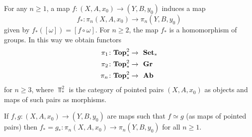 \begin{nn}
For any $n\geq 1$, a map $f\colon (X, A, x_{0}) \to (Y, B, y_{0})$ induces a map 
\[
f_{\ast}\colon \pi_{n}(X, A, x_{0}) \to \pi_{n}(Y, B, y_{0})
\] 
given by $f_{\ast}([\omega]) = [f\circ\omega]$. For $n\geq 2$, the map $f_{\ast}$
is a homomorphism of groups. In this way we obtain functors
\begin{align*}
\pi_{1}\colon {\mathbf{Top}}^{2}_{\ast} \to &\ \  {\mathbf{Set}}_{\ast} \\
\pi_{2}\colon {\mathbf{Top}}^{2}_{\ast} \to &\ \  {\mathbf{Gr}}  \\
\pi_{n}\colon {\mathbf{Top}}^{2}_{\ast} \to &\ \  {\mathbf{Ab}}  \\
\end{align*}
\vskip -8mm
for $n\geq 3$, where $\Top^{2}_{\ast}$ is the category of pointed pairs $(X, A, x_{0})$
as objects and maps of such pairs as morphisms.
\vskip -8mm
\end{nn}

\begin{proposition}
If $f, g\colon (X, A, x_{0}) \to (Y, B, y_{0})$ are maps such that $f\simeq g$ (as maps 
of pointed pairs) then $f_{\ast} = g_{\ast}\colon \pi_{n}(X, A, x_{0})\to \pi_{n}(Y, B, y_{0})$
for all $n\geq 1$. 
\end{proposition}


